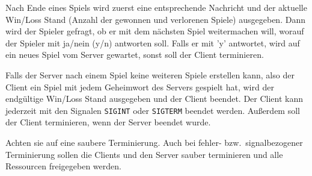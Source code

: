 Nach Ende eines Spiels wird zuerst eine entsprechende Nachricht und der
aktuelle Win/Loss Stand (Anzahl der gewonnen und verlorenen Spiele)
ausgegeben. Dann wird der Spieler gefragt, ob er mit dem nächsten Spiel
weitermachen will, worauf der Spieler mit ja/nein (y/n) antworten soll. Falls
er mit 'y' antwortet, wird auf ein neues Spiel vom Server gewartet, sonst soll
der Client terminieren.

Falls der Server nach einem Spiel keine weiteren Spiele erstellen kann, also
der Client ein Spiel mit jedem Geheimwort des Servers gespielt hat, wird der
endgültige Win/Loss Stand ausgegeben und der Client beendet. Der Client kann
jederzeit mit den Signalen \verb|SIGINT| oder \verb|SIGTERM| beendet werden.
Außerdem soll der Client terminieren, wenn der Server beendet wurde.


Achten sie auf eine saubere Terminierung.
Auch bei fehler- bzw.\ signalbezogener Terminierung sollen die Clients
und den Server sauber terminieren und alle Ressourcen freigegeben werden.

\osueguidelinesthree


